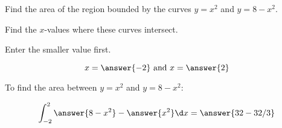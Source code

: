 \documentclass{ximera}
\author{Jason Miller}
\begin{document}
\begin{exercise}

Find the area of the region bounded by the curves $y=x^{2}$ and $y=8-x^{2}$. 

Find the $x$-values where these curves intersect.  
\begin{prompt}
Enter the smaller value first.
\end{prompt}

\[
x= \answer{-2} \text{  and  } x= \answer{2}
\]

\begin{exercise}
To find the area between $y=x^{2}$ and $y=8-x^{2}:$

\[
\int_{-2}^{2} \answer{8-x^2} - \answer{x^2}  \d x = \answer{32-32/3}
\]

\end{exercise}

\end{exercise}
\end{document}
